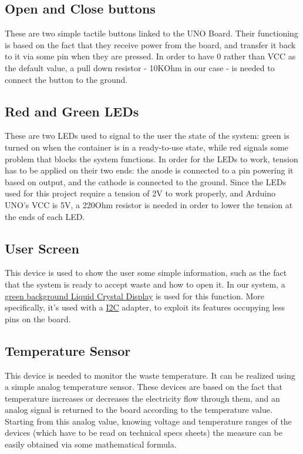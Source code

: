 \documentclass[a4paper,12pt]{report}
\begin{document}
	\subsection{Open and Close buttons}
	These are two simple tactile buttons linked to the UNO Board.\newline
	Their functioning is based on the fact that they receive power from the board, and transfer it back to it via some pin when they are pressed. In order to have 0 rather than VCC as the default value, a pull down resistor - 10KOhm in our case - is needed to connect the button to the ground.
	
	\subsection{Red and Green LEDs}
	These are two LEDs used to signal to the user the state of the system: green is turned on when the container is in a ready-to-use state, while red signals some problem that blocks the system functions.\newline
	In order for the LEDs to work, tension has to be applied on their two ends: the anode is connected to a pin powering it based on output, and the cathode is connected to the ground. Since the LEDs used for this project require a tension of 2V to work properly, and Arduino UNO's VCC is 5V, a 220Ohm resistor is needed in order to lower the tension at the ends of each LED.
	
	\subsection{User Screen}
	This device is used to show the user some simple information, such as the fact that the system is ready to accept waste and how to open it.\newline
	In our system, a \href{https://robot-italy.com/products/16x2-lcd-display-green?_pos=3&_psq=display+lcd&_ss=e&_v=1.0}{green background Liquid Crystal Display} is used for this function. More specifically, it's used with a \href{https://en.wikipedia.org/wiki/I%C2%B2C}{I2C} adapter, to exploit its features occupying less pins on the board.
	
	\subsection{Temperature Sensor}
	This device is needed to monitor the waste temperature.\newline
	It can be realized using a simple analog temperature sensor. These devices are based on the fact that temperature increases or decreases the electricity flow through them, and an analog signal is returned to the board according to the temperature value. Starting from this analog value, knowing voltage and temperature ranges of the devices (which have to be read on technical specs sheets) the measure can be easily obtained via some mathematical formula. 
	
\end{document}

